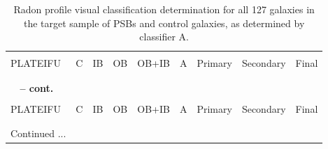 \begin{longtable}{p{2.1cm}p{0.8cm}p{0.8cm}p{0.8cm}p{0.8cm}p{0.8cm}p{1.5cm}p{1.5cm}p{1.2cm}}
\caption[Radon profile visual classification of PSBs and controls - classifier A]{Radon profile visual classification determination for all 127 galaxies in the target sample of PSBs and control galaxies, as determined by classifier A.}
\label{tab:full-visual-classification} \\

\hline
\\
PLATEIFU & C & IB & OB & OB+IB & A & Primary & Secondary & Final \\
\\
\hline
\\
\endfirsthead
%
{{\bfseries \tablename\ \thetable{} -- cont.}}
\\
\hline
\\
PLATEIFU & C & IB & OB & OB+IB & A & Primary & Secondary & Final \\
\\
\hline
\\
\endhead

\hline 
{{Continued ...}}
\endfoot
\hline
\endlastfoot


\end{longtable}
